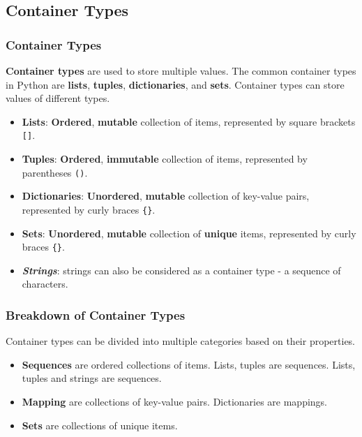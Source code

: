 \documentclass[beamer, en, version=2.0]{huangfusl-template}
\begin{document}
    \subsection{Container Types}
    \begin{frame}[fragile]
        \frametitle{Container Types}

        \textbf{Container types} are used to store multiple values. The common container types in Python are \textbf{lists}, \textbf{tuples}, \textbf{dictionaries}, and \textbf{sets}. Container types can store values of different types.

        \begin{itemize}
            \item \textbf{Lists}: \textbf{Ordered}, \textbf{mutable} collection of items, represented by square brackets {\footnotesize\verb|[]|}.
            \item \textbf{Tuples}: \textbf{Ordered}, \textbf{immutable} collection of items, represented by parentheses {\footnotesize\verb|()|}.
            \item \textbf{Dictionaries}: \textbf{Unordered}, \textbf{mutable} collection of key-value pairs, represented by curly braces {\footnotesize\verb|{}|}.
            \item \textbf{Sets}: \textbf{Unordered}, \textbf{mutable} collection of \textbf{unique} items, represented by curly braces {\footnotesize\verb|{}|}.
            \item \textit{\textbf{Strings}}: strings can also be considered as a container type - a sequence of characters.
        \end{itemize}
    \end{frame}
    \begin{frame}[fragile]
        \frametitle{Breakdown of Container Types}

        Container types can be divided into multiple categories based on their properties.

        \begin{itemize}
            \item \textbf{Sequences} are ordered collections of items. Lists, tuples are sequences. Lists, tuples and strings are sequences.
            \item \textbf{Mapping} are collections of key-value pairs. Dictionaries are mappings.
            \item \textbf{Sets} are collections of unique items.
        \end{itemize}
    \end{frame}
\end{document}
